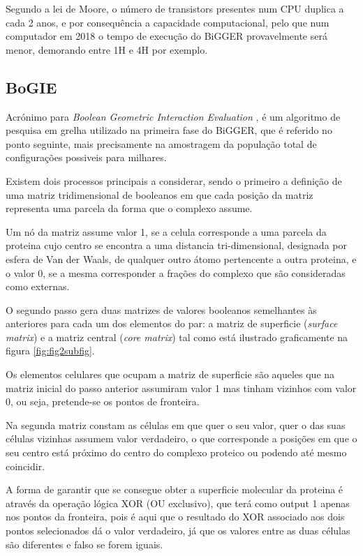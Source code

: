 Segundo a lei de Moore, o número de transistors presentes num CPU duplica a cada 2 anos, e por consequência a capacidade computacional, pelo que num computador em 2018 o tempo de execução do BiGGER provavelmente será menor, demorando entre 1H e 4H por exemplo.



\subsection{BoGIE}
\label{bogieAlg}
Acrónimo para \textit{Boolean Geometric Interaction Evaluation}\cite{teseProf} \cite{biggerPaper}, é um algoritmo de pesquisa em grelha utilizado na primeira fase do BiGGER, que é referido no ponto seguinte, mais precisamente na amostragem da população total de configurações possiveis para milhares.

 Existem dois processos principais a considerar, sendo o primeiro a definição de uma matriz tridimensional de booleanos em que cada posição da matriz representa uma parcela da forma que o complexo assume.
 
 Um nó da matriz assume valor 1, se a celula corresponde a uma parcela da proteina cujo centro se encontra a uma distancia tri-dimensional, designada por esfera de Van der Waals, de qualquer outro átomo pertencente a outra proteina, e o valor 0, se a mesma corresponder a frações do complexo que são consideradas como externas.

O segundo passo gera duas matrizes de valores booleanos semelhantes às anteriores para cada um dos elementos do par: a matriz de superficie (\textit{surface matrix}) e a matriz central (\textit{core matrix}) tal como está ilustrado graficamente na figura \ref{fig:fig2subfig}.

Os elementos celulares que ocupam a matriz de superficie são aqueles que na matriz inicial do passo anterior assumiram valor 1 mas tinham vizinhos com valor 0, ou seja, pretende-se os pontos de fronteira. 
 
 Na segunda matriz constam as células em que quer o seu valor, quer o das suas células vizinhas assumem valor verdadeiro, o que corresponde a posições em que o seu centro está próximo do centro do complexo proteico ou podendo até mesmo coincidir. 
 
 A forma de garantir que se consegue obter a superficie molecular da proteina é através da operação lógica XOR (OU exclusivo), que terá como output 1 apenas nos pontos da fronteira, pois é aqui que o resultado do XOR associado aos dois pontos selecionados dá o valor verdadeiro, já que os valores entre as duas células são diferentes e falso se forem iguais.
 
